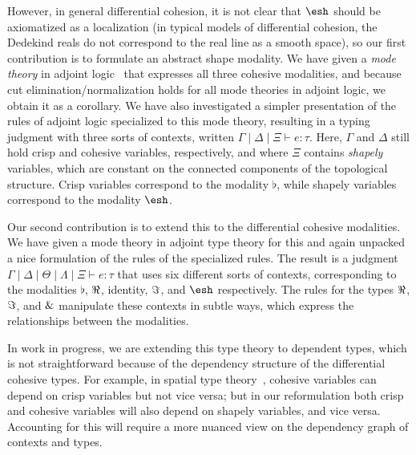 \documentclass{article}
\begin{document}
However, in general differential cohesion, it is not clear that $\shape$
should be axiomatized as a localization (in typical models of
differential cohesion, the Dedekind reals do not correspond to the real
line as a smooth space), so our first contribution is to formulate an
abstract shape modality.  We have given a \emph{mode theory} in adjoint
logic~\citep{Licata2017} that expresses all three cohesive modalities,
and because cut elimination/normalization holds for all mode theories in
adjoint logic, we obtain it as a corollary.  We have also investigated a
simpler presentation of the rules of adjoint logic specialized to this
mode theory, resulting in a typing judgment with three sorts of
contexts, written $\Gamma \mid \Delta \mid \Xi \vdash e : \tau$.  Here,
$\Gamma$ and $\Delta$ still hold crisp and cohesive variables,
respectively, and where $\Xi$ contains \emph{shapely} variables, which
are constant on the connected components of the topological structure.
Crisp variables correspond to the modality $\flat$, while shapely
variables correspond to the modality $\shape$.

Our second contribution is to extend this to the differential cohesive
modalities.  We have given a mode theory in adjoint type theory for this
and again unpacked a nice formulation of the rules of the specialized
rules.  The result is a judgment $\Gamma \mid \Delta \mid \Theta \mid
\Lambda \mid \Xi \vdash e : \tau$ that uses six different sorts of
contexts, corresponding to the modalities $\flat$, $\Re$, identity,
$\Im$, and $\shape$ respectively.  The rules for the types
$\Re$, $\Im$, and $\&$ manipulate these contexts in subtle ways,
which express the relationships between the modalities.

In work in progress, we are extending this type theory to dependent
types, which is not straightforward because of the dependency structure
of the differential cohesive types.  For example, in spatial type
theory~\citep{Shulman2015}, cohesive variables can depend on crisp
variables but not vice versa; but in our reformulation both crisp and
cohesive variables will also depend on shapely variables, and vice
versa.  Accounting for this will require a more nuanced view on the
dependency graph of contexts and types.

\end{document}
